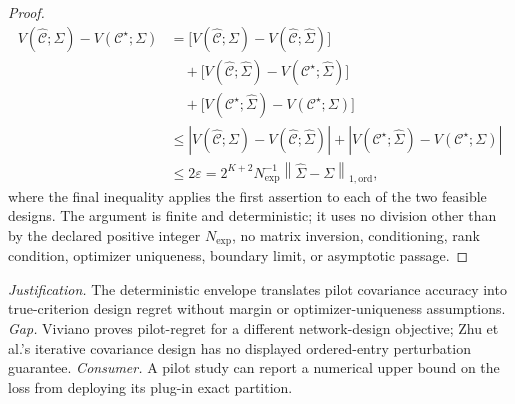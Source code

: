 \documentclass{article}
\begin{document}
\begin{proof}
\[
\begin{aligned}
V(\widehat{\mathcal C};\Sigma)-V(\mathcal C^\star;\Sigma)
&=\bigl[V(\widehat{\mathcal C};\Sigma)
          -V(\widehat{\mathcal C};\widehat\Sigma)\bigr]\\
&\quad+\bigl[V(\widehat{\mathcal C};\widehat\Sigma)
          -V(\mathcal C^\star;\widehat\Sigma)\bigr]\\
&\quad+\bigl[V(\mathcal C^\star;\widehat\Sigma)
          -V(\mathcal C^\star;\Sigma)\bigr]\\
&\le
 \left|V(\widehat{\mathcal C};\Sigma)
          -V(\widehat{\mathcal C};\widehat\Sigma)\right|
 +\left|V(\mathcal C^\star;\widehat\Sigma)
          -V(\mathcal C^\star;\Sigma)\right|\\
&\le 2\varepsilon
=2^{K+2}N_{\exp}^{-1}
       \left\|\widehat\Sigma-\Sigma\right\|_{1,\mathrm{ord}},
\end{aligned}
\]
where the final inequality applies the first assertion to each of the two feasible designs.  The argument is finite and deterministic; it uses no division other than by the declared positive integer \(N_{\exp}\), no matrix inversion, conditioning, rank condition, optimizer uniqueness, boundary limit, or asymptotic passage.
\end{proof}
\par\smallskip\noindent \textit{Justification.} The deterministic envelope translates pilot covariance accuracy into true-criterion design regret without margin or optimizer-uniqueness assumptions. \textit{Gap.} Viviano proves pilot-regret for a different network-design objective; Zhu et al.'s iterative covariance design has no displayed ordered-entry perturbation guarantee. \textit{Consumer.} A pilot study can report a numerical upper bound on the loss from deploying its plug-in exact partition.
\end{document}
